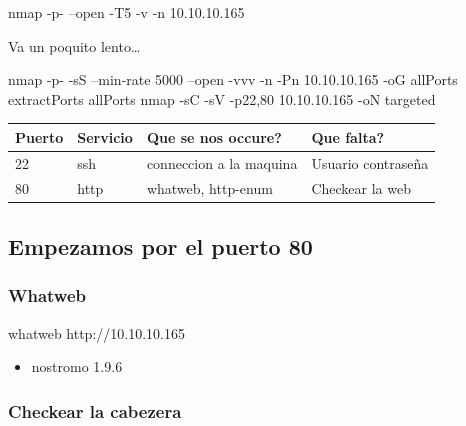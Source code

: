 \documentclass{assets/ipesethesis}
\newenvironment{Shaded}{\begin{snugshade}}{\end{snugshade}}
\newcommand{\ExtensionTok}[1]{#1}
\newcommand{\FunctionTok}[1]{\textcolor[rgb]{0.00,0.00,0.00}{#1}}
\newcommand{\NormalTok}[1]{#1}
\providecommand{\tightlist}{%
  \setlength{\itemsep}{0pt}\setlength{\parskip}{0pt}}
\begin{document}
\begin{Shaded}
\begin{Highlighting}[]
\FunctionTok{nmap}\NormalTok{ -p- --open -T5 -v -n 10.10.10.165}
\end{Highlighting}
\end{Shaded}

Va un poquito lento\ldots{}

\begin{Shaded}
\begin{Highlighting}[]
\FunctionTok{nmap}\NormalTok{ -p- -sS --min-rate 5000 --open -vvv -n -Pn 10.10.10.165 -oG allPorts}
\ExtensionTok{extractPorts}\NormalTok{ allPorts}
\FunctionTok{nmap}\NormalTok{ -sC -sV -p22,80 10.10.10.165 -oN targeted}
\end{Highlighting}
\end{Shaded}

\begin{longtable}[]{@{}llll@{}}
\toprule
Puerto & Servicio & Que se nos occure? & Que falta?\tabularnewline
\midrule
\endhead
22 & ssh & conneccion a la maquina & Usuario contraseña\tabularnewline
80 & http & whatweb, http-enum & Checkear la web\tabularnewline
\bottomrule
\end{longtable}

\hypertarget{empezamos-por-el-puerto-80-1}{%
\subsection*{Empezamos por el puerto 80}\label{empezamos-por-el-puerto-80-1}}

\hypertarget{whatweb-1}{%
\subsubsection*{Whatweb}\label{whatweb-1}}

\begin{Shaded}
\begin{Highlighting}[]
\ExtensionTok{whatweb}\NormalTok{ http://10.10.10.165}
\end{Highlighting}
\end{Shaded}

\begin{itemize}
\tightlist
\item
  nostromo 1.9.6
\end{itemize}

\hypertarget{checkear-la-cabezera}{%
\subsubsection*{Checkear la cabezera}\label{checkear-la-cabezera}}
\end{document}
